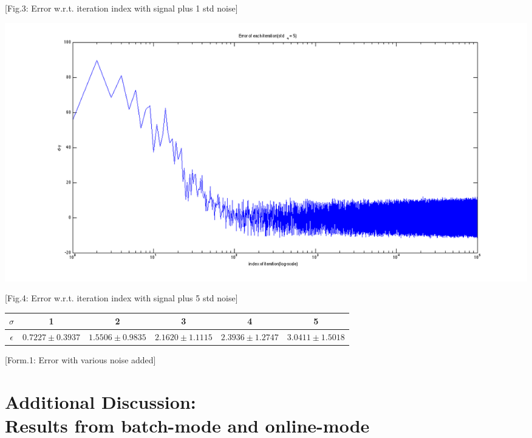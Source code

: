 \documentclass[12pt]{article}
\begin{document}
\begin{enumerate}
	\begin{center}
		[Fig.3: Error w.r.t. iteration index with signal plus 1 std noise]
	\end{center}
	\hspace*{-4em}
	\includegraphics[scale=.45]{../res/error_std5_eta7-7.png}
	\begin{center}
		[Fig.4: Error w.r.t. iteration index with signal plus 5 std noise]
	\end{center}
	\begin{center}
		\begin{tabular}{|c|c|c|c|c|c|}
			\hline
			$\sigma$ & 1 & 2 & 3 & 4 & 5 \\
			\hline
			$\epsilon$ & $0.7227\pm 0.3937$ & $1.5506\pm 0.9835$ & $2.1620\pm 1.1115$ & $2.3936\pm 1.2747$ & $3.0411\pm 1.5018$ \\
			\hline
		\end{tabular}
		
		[Form.1: Error with various noise added]
	\end{center}
	
\end{enumerate}

\section*{Additional Discussion: \\ Results from batch-mode and online-mode}
\vspace{-20pt}
\noindent\makebox[\linewidth]{\rule{\textwidth}{0.4pt}}
\end{document}
